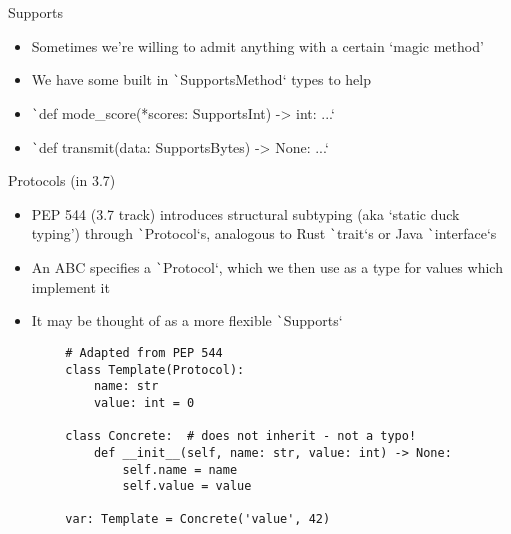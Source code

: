 \documentclass[10pt]{beamer}
\begin{document}
\begin{frame}{Supports\*}
    \begin{itemize}[<+->]
        \item Sometimes we're willing to admit anything with a certain `magic method'
        \item We have some built in \texttt`SupportsMethod` types to help
    \end{itemize}
    
    \pause\begin{examples}
    \begin{itemize}[<+->]
        \item \texttt`def mode_score(*scores: SupportsInt) -> int: ...`
        \item \texttt`def transmit(data: SupportsBytes) -> None: ...`
    \end{itemize}
    \end{examples}
\end{frame}

\begin{frame}[fragile,shrink=10]{Protocols (in 3.7)}
    \begin{itemize}[<+->]
        \item PEP 544 (3.7 track) introduces structural subtyping (aka `static duck typing') through \texttt`Protocol`s, analogous to Rust \texttt`trait`s or Java  \texttt`interface`s
        \item An ABC specifies a \texttt`Protocol`, which we then use as a type for values which implement it
        \item It may be thought of as a more flexible \texttt`Supports`
    \end{itemize}

    \pause\begin{verbatim}
        # Adapted from PEP 544
        class Template(Protocol):
            name: str
            value: int = 0
        
        class Concrete:  # does not inherit - not a typo!
            def __init__(self, name: str, value: int) -> None:
                self.name = name
                self.value = value
        
        var: Template = Concrete('value', 42)
    \end{verbatim}
\end{frame}
\end{document}
